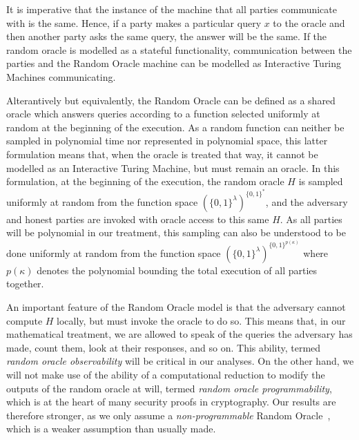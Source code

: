 It is imperative that the instance of the machine that all parties communicate
with is the same. Hence, if a party makes a particular query $x$ to the oracle
and then another party asks the same query, the answer will be the same. If the
random oracle is modelled as a stateful functionality, communication between the
parties and the Random Oracle machine can be modelled as Interactive Turing
Machines communicating.

Alterantively but equivalently, the Random Oracle can be defined as a shared
oracle which answers queries according to a function selected uniformly at
random at the beginning of the execution. As a random function can neither be
sampled in polynomial time nor represented in polynomial space, this latter
formulation means that, when the oracle is treated that way, it cannot be
modelled as an Interactive Turing Machine, but must remain an oracle. In this
formulation, at the beginning of the execution, the random oracle $H$ is sampled
uniformly at random from the function space $(\{0, 1\}^\lambda)^{\{0, 1\}^*}$,
and the adversary and honest parties are invoked with oracle access to this same
$H$. As all parties will be polynomial in our treatment, this sampling can also
be understood to be done uniformly at random from the function space $(\{0,
1\}^\lambda)^{\{0, 1\}^{p(\kappa)}}$ where $p(\kappa)$ denotes the polynomial
bounding the total execution of all parties together.

An important feature of the Random Oracle model is that the adversary cannot
compute $H$ locally, but must invoke the oracle to do so. This means that, in
our mathematical treatment, we are allowed to speak of the queries the adversary
has made, count them, look at their responses, and so on. This ability, termed
\emph{random oracle observability} will be critical in our analyses. On the
other hand, we will not make use of the ability of a computational reduction to
modify the outputs of the random oracle at will, termed \emph{random oracle
programmability}, which is at the heart of many security proofs in cryptography.
Our results are therefore stronger, as we only assume a \emph{non-programmable}
Random Oracle~\cite{nielsen2002separating,fischlin2010random}, which is a weaker
assumption than usually made.
